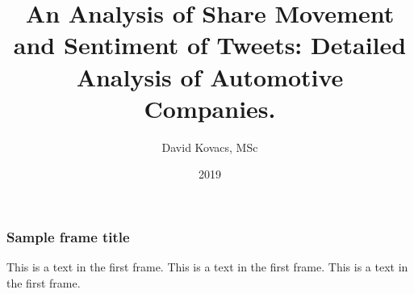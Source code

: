 \documentclass{beamer}
\title{An Analysis of Share Movement and Sentiment of Tweets: Detailed Analysis of Automotive Companies.}
\author{David Kovacs, MSc}
\institute{Matriculation No.: 00851488}
\date{2019}
\begin{document}
 
\frame{\titlepage}
 
\begin{frame}
\frametitle{Sample frame title}
This is a text in the first frame. \pause This is a text in the first frame. \pause This is a text in the first frame.
\end{frame}
 
\end{document}
